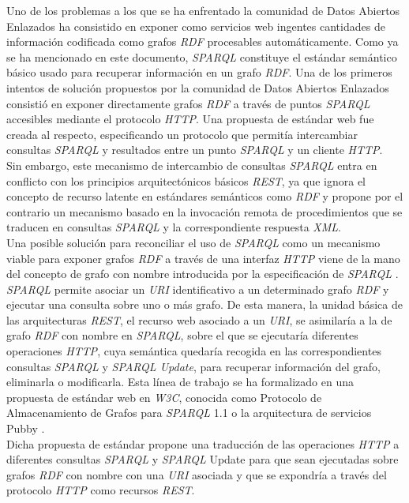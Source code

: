 Uno de los problemas a los que se ha enfrentado la comunidad de Datos Abiertos Enlazados  ha consistido en exponer como servicios web ingentes cantidades de informaci\'on codificada como grafos \textit{RDF} procesables autom\'aticamente. Como ya se ha mencionado en este documento, \textit{SPARQL} constituye el est\'andar sem\'antico b\'asico usado para recuperar informaci\'on en un grafo \textit{RDF}. Una de los primeros intentos de soluci\'on propuestos por la comunidad de Datos Abiertos Enlazados consisti\'o en exponer directamente grafos \textit{RDF} a trav\'es de puntos \textit{SPARQL} accesibles mediante el protocolo \textit{HTTP}. Una propuesta de est\'andar web fue creada al respecto, especificando un protocolo \cite{sparql_protocol} que permit\'ia intercambiar consultas \textit{SPARQL} y resultados entre un punto \textit{SPARQL} y un cliente \textit{HTTP}.\\
Sin embargo, este mecanismo de intercambio de consultas \textit{SPARQL} entra en conflicto con los principios arquitect\'onicos b\'asicos \textit{REST}, ya que ignora el concepto de recurso latente en est\'andares sem\'anticos como \textit{RDF} y propone por el contrario un mecanismo basado en la invocaci\'on remota de procedimientos que se traducen en consultas \textit{SPARQL} y la correspondiente respuesta \textit{XML}.\\
Una posible soluci\'on para reconciliar el uso de \textit{SPARQL} como un mecanismo viable para exponer grafos \textit{RDF} a trav\'es de una interfaz \textit{HTTP} viene de la mano del concepto de grafo con nombre introducida por la especificaci\'on de \textit{SPARQL} \cite{wilde2009restful}. \textit{SPARQL} permite asociar un \textit{URI} identificativo a un determinado grafo \textit{RDF} y ejecutar una consulta sobre uno o m\'as grafo. De esta manera, la unidad b\'asica de las arquitecturas \textit{REST}, el recurso web asociado a un \textit{URI}, se asimilar\'ia a la de grafo \textit{RDF} con nombre en \textit{SPARQL}, sobre el que se ejecutar\'ia diferentes operaciones \textit{HTTP}, cuya sem\'antica quedar\'ia recogida en las correspondientes consultas \textit{SPARQL} y \textit{SPARQL Update}, para recuperar informaci\'on del grafo, eliminarla o modificarla.
Esta l\'inea de trabajo se ha formalizado en una propuesta de est\'andar web en \textit{W3C}, conocida como Protocolo de Almacenamiento de Grafos para \textit{SPARQL} 1.1 \cite{ogbuji2011sparql} o la arquitectura de servicios Pubby \cite{cyganiak2008pubby}.\\
Dicha propuesta de est\'andar propone una traducci\'on de las operaciones \textit{HTTP} a diferentes consultas \textit{SPARQL}  y \textit{SPARQL} Update para que sean ejecutadas sobre grafos \textit{RDF} con nombre con una \textit{URI} asociada y que se expondr\'ia a trav\'es del protocolo \textit{HTTP} como recursos \textit{REST}.\\
